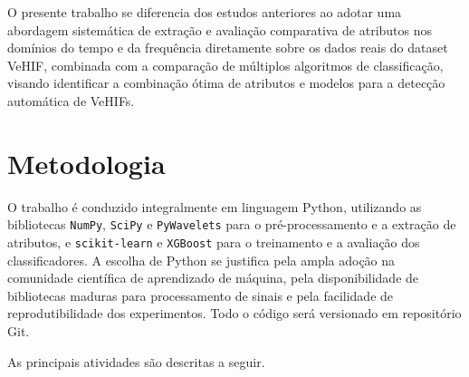 O presente trabalho se diferencia dos estudos anteriores ao adotar uma abordagem sistemática de extração e avaliação comparativa de atributos nos domínios do tempo e da frequência diretamente sobre os dados reais do dataset VeHIF, combinada com a comparação de múltiplos algoritmos de classificação, visando identificar a combinação ótima de atributos e modelos para a detecção automática de VeHIFs.


\section{Metodologia}

O trabalho é conduzido integralmente em linguagem Python, utilizando as bibliotecas \texttt{NumPy}, \texttt{SciPy} e \texttt{PyWavelets} para o pré-processamento e a extração de atributos, e \texttt{scikit-learn} e \texttt{XGBoost} para o treinamento e a avaliação dos classificadores. A escolha de Python se justifica pela ampla adoção na comunidade científica de aprendizado de máquina, pela disponibilidade de bibliotecas maduras para processamento de sinais e pela facilidade de reprodutibilidade dos experimentos. Todo o código será versionado em repositório Git.

As principais atividades são descritas a seguir.

